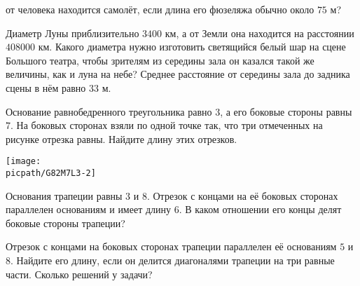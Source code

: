 \begin{class}[number=3]
\begin{listofex}
		от человека находится самолёт, если длина его фюзеляжа обычно около \( 75 \) м?
		\item Диаметр Луны приблизительно \( 3400 \) км, а от Земли она находится на расстоянии	\( 408000 \) км. Какого диаметра нужно изготовить светящийся белый шар на сцене Большого театра, чтобы зрителям из середины зала он казался такой же величины, как и луна на небе? Среднее расстояние от середины зала до задника сцены в нём равно \( 33 \) м.
		\item Основание равнобедренного треугольника равно \( 3 \), а его боковые стороны равны \( 7 \). На боковых сторонах взяли по одной точке так, что три отмеченных на рисунке отрезка равны. Найдите длину этих отрезков.
		\begin{center}
			\texttt{[image: \\picpath/G82M7L3-2]}
		\end{center}
		\item Основания трапеции равны \( 3 \) и \( 8 \). Отрезок с концами на её боковых сторонах параллелен основаниям и имеет длину \( 6 \). В каком отношении его концы делят боковые стороны трапеции?
		\item Отрезок с концами на боковых сторонах	трапеции параллелен её основаниям \( 5 \) и \( 8 \). Найдите его длину, если он делится диагоналями трапеции на три равные части. Сколько решений у задачи?
	\end{listofex}
\end{class}

